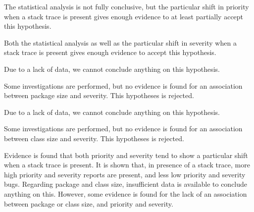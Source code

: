 \questiona{}

\vspace{\baselineskip}
\hypaa{}
\vspace{\baselineskip}

\noindent
The statistical analysis is not fully conclusive, but the particular shift in priority when a stack trace is present gives enough evidence to at least partially accept this hypothesis.

\vspace{\baselineskip}
\hypab{}
\vspace{\baselineskip}

\noindent
Both the statistical analysis as well as the particular shift in severity when a stack trace is present gives enough evidence to accept this hypothesis.

\vspace{\baselineskip}
\hypac{}
\vspace{\baselineskip}

\noindent
Due to a lack of data, we cannot conclude anything on this hypothesis.

\vspace{\baselineskip}
\hypad{}
\vspace{\baselineskip}

\noindent
Some investigations are performed, but no evidence is found for an association between package size and severity. This hypotheses is rejected.

\vspace{\baselineskip}
\hypae{}
\vspace{\baselineskip}

\noindent
Due to a lack of data, we cannot conclude anything on this hypothesis.

\vspace{\baselineskip}
\hypaf{}
\vspace{\baselineskip}

\noindent
Some investigations are performed, but no evidence is found for an association between class size and severity. This hypotheses is  rejected.

Evidence is found that both priority and severity tend to show a particular shift when a stack trace is present. It is shown that, in presence of a stack trace, more high priority and severity reports are present, and less low priority and severity bugs. Regarding package and class size, insufficient data is available to conclude anything on this. However, some evidence is found for the lack of an association between package or class size, and priority and severity. 

